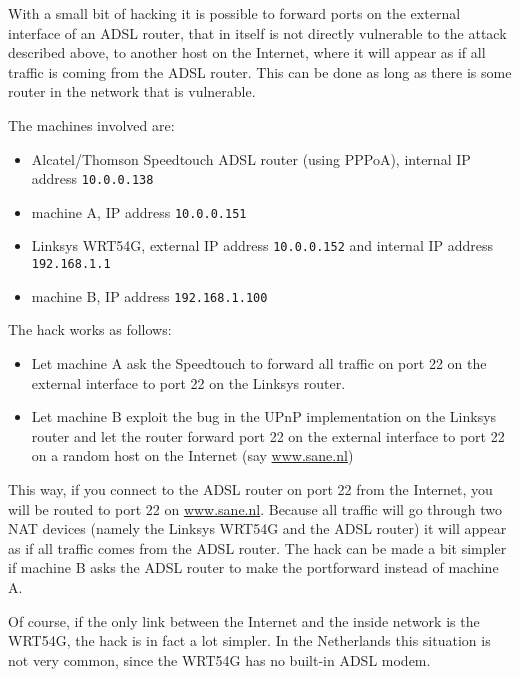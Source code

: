 \documentclass[10pt]{article}
\begin{document}
With a small bit of hacking it is possible to forward ports on the external
interface of an ADSL router, that in itself is not directly vulnerable to the
attack described above, to another host on the Internet, where it will appear
as if all traffic is coming from the ADSL router. This can be done as long as
there is some router in the network that is vulnerable.

The machines involved are:

\begin{itemize}
\item Alcatel/Thomson Speedtouch ADSL router (using PPPoA), internal IP address \texttt{10.0.0.138}
\item machine A, IP address \texttt{10.0.0.151}
\item Linksys WRT54G, external IP address \texttt{10.0.0.152} and internal
IP address \texttt{192.168.1.1}
\item machine B, IP address \texttt{192.168.1.100}
\end{itemize}

\begin{center}
\end{center}


The hack works as follows:

\begin{itemize}
\item Let machine A ask the Speedtouch to forward all traffic on port 22
on the external interface to port 22 on the Linksys router.
\item Let machine B exploit the bug in the UPnP implementation on the Linksys
router and let the router forward port 22 on the external interface to port
22 on a random host on the Internet (say \url{www.sane.nl})
\end{itemize}

This way, if you connect to the ADSL router on port 22 from the Internet,
you will be routed to port 22 on \url{www.sane.nl}. Because all
traffic will go through two NAT devices (namely the Linksys WRT54G and the
ADSL router) it will appear as if all traffic comes from the ADSL router.
The hack can be made a bit simpler if machine B asks the ADSL router to make
the portforward instead of machine A.

Of course, if the only link between the Internet and the inside network
is the WRT54G, the hack is in fact a lot simpler. In the Netherlands this
situation is not very common, since the WRT54G has no built-in ADSL
modem.
\end{document}
